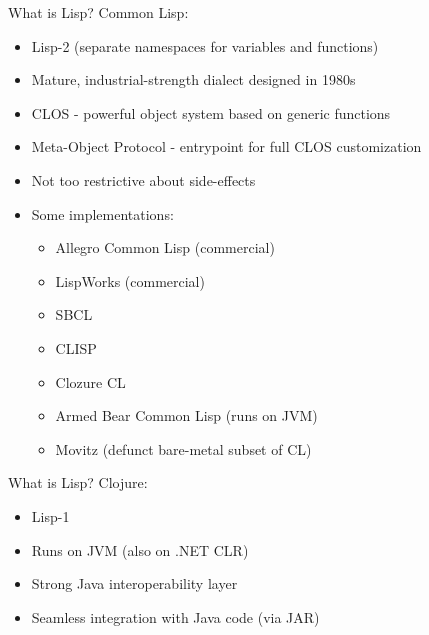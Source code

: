 \documentclass[pdf]{beamer}
\begin{document}
\begin{frame}{What is Lisp?}
  Common Lisp:
  \pause
  \begin{itemize}
  \item Lisp-2 (separate namespaces for variables and functions)
    \pause
  \item Mature, industrial-strength dialect designed in 1980s
    \pause
  \item CLOS - powerful object system based on generic functions
    \pause
  \item Meta-Object Protocol - entrypoint for full CLOS customization
    \pause
  \item Not too restrictive about side-effects
    \pause
  \item Some implementations:
    \pause
    \begin{itemize}
    \item Allegro Common Lisp (commercial)
      \pause
    \item LispWorks (commercial)
      \pause
    \item SBCL
      \pause
    \item CLISP
      \pause
    \item Clozure CL
      \pause
    \item Armed Bear Common Lisp (runs on JVM)
      \pause
    \item Movitz (defunct bare-metal subset of CL)
    \end{itemize}
  \end{itemize}
\end{frame}

\begin{frame}{What is Lisp?}
  Clojure:
  \pause
  \begin{itemize}
  \item Lisp-1
    \pause
  \item Runs on JVM (also on .NET CLR)
    \pause
  \item Strong Java interoperability layer
    \pause
  \item Seamless integration with Java code (via JAR)
  \end{itemize}
\end{frame}
\end{document}
